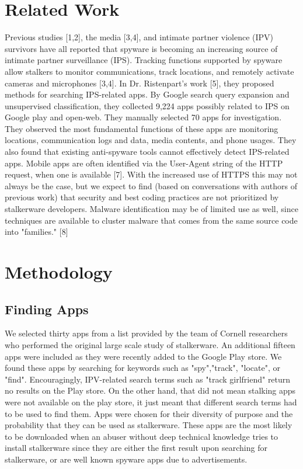 \documentclass[acmtog]{acmart}
\begin{document}
\section{Related Work}
Previous studies [1,2], the media [3,4], and intimate partner violence (IPV) 
survivors have all reported that spyware is becoming an increasing source of 
intimate partner surveillance (IPS). Tracking functions supported by spyware 
allow stalkers to monitor communications, track locations, and remotely 
activate cameras and microphones [3,4]. In Dr. Ristenpart's work [5], they 
proposed methods for searching IPS-related apps. By Google search query 
expansion and unsupervised classification, they collected 9,224 apps possibly 
related to IPS on Google play and open-web. They manually selected 70 apps for 
investigation. They observed the most fundamental functions of these apps are 
monitoring locations, communication logs and data, media contents, and phone 
usages. They also found that existing anti-spyware tools cannot effectively 
detect IPS-related apps.
Mobile apps are often identified via the User-Agent string of the HTTP request, 
when one is available [7]. With the increased use of HTTPS this may not always 
be the case, but we expect to find (based on conversations with authors of 
previous work) that security and best coding practices are not prioritized by 
stalkerware developers. Malware identification may be of limited use as well, 
since techniques are available to cluster malware that comes from the same 
source code into "families." [8]

\section{Methodology}
\subsection{Finding Apps}
We selected thirty apps from a list provided by the team of Cornell researchers 
who performed the original large scale study of 
stalkerware\cite{chatterjee_spyware_2018}. An 
additional fifteen apps were included as they were recently added to the Google 
Play store. We found these apps by searching for keywords such as 
"spy","track", "locate", or "find". Encouragingly, IPV-related search terms 
such as "track girlfriend" return no results on the Play store. On the other 
hand, that did not mean stalking apps were not available on the play store, it 
just meant that different search terms had to be used to find them. Apps were 
chosen for their diversity of purpose and the probability that 
they can be used as stalkerware. These apps are the most likely to be 
downloaded when an abuser without deep technical knowledge tries to install 
stalkerware since they are either the first result upon searching for 
stalkerware, or are well known spyware apps due to advertisements.
\end{document}
